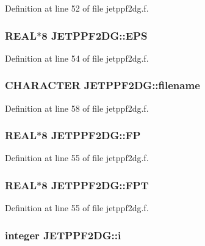 Definition at line 52 of file jetppf2dg.f.\hypertarget{namespaceJETPPF2DG_9bcf5731b1080d6e8a268dc44d2c30a0}{
\subsubsection[EPS]{\setlength{\rightskip}{0pt plus 5cm}REAL$\ast$8 {\bf JETPPF2DG::EPS}}}
\label{namespaceJETPPF2DG_9bcf5731b1080d6e8a268dc44d2c30a0}




Definition at line 54 of file jetppf2dg.f.\hypertarget{namespaceJETPPF2DG_9a2fec5fe980e03ddb99646d384a4d47}{
\subsubsection[filename]{\setlength{\rightskip}{0pt plus 5cm}CHARACTER {\bf JETPPF2DG::filename}}}
\label{namespaceJETPPF2DG_9a2fec5fe980e03ddb99646d384a4d47}




Definition at line 58 of file jetppf2dg.f.\hypertarget{namespaceJETPPF2DG_049a0aaf18dbe2243eb88e6b3098e4d3}{
\subsubsection[FP]{\setlength{\rightskip}{0pt plus 5cm}REAL$\ast$8 {\bf JETPPF2DG::FP}}}
\label{namespaceJETPPF2DG_049a0aaf18dbe2243eb88e6b3098e4d3}




Definition at line 55 of file jetppf2dg.f.\hypertarget{namespaceJETPPF2DG_697e63ef731b230d271dcbe3e66f07b2}{
\subsubsection[FPT]{\setlength{\rightskip}{0pt plus 5cm}REAL$\ast$8 {\bf JETPPF2DG::FPT}}}
\label{namespaceJETPPF2DG_697e63ef731b230d271dcbe3e66f07b2}




Definition at line 55 of file jetppf2dg.f.\hypertarget{namespaceJETPPF2DG_cd9af8b5846f3015549a65dac27297d6}{
\subsubsection[i]{\setlength{\rightskip}{0pt plus 5cm}integer {\bf JETPPF2DG::i}}}
\label{namespaceJETPPF2DG_cd9af8b5846f3015549a65dac27297d6}





